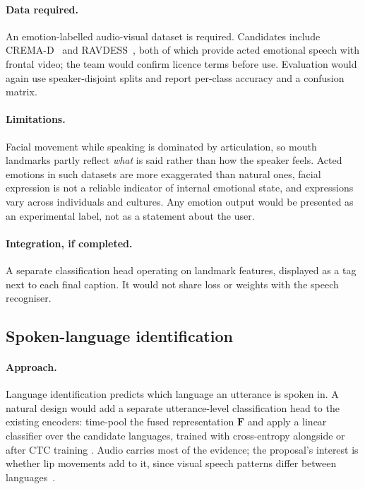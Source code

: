 \paragraph{Data required.} An emotion-labelled audio-visual dataset is
required. Candidates include CREMA-D~\cite{cao2014} and RAVDESS~\cite{livingstone2018},
both of which provide acted emotional speech with frontal video; the team would
confirm licence terms before use. Evaluation would again use speaker-disjoint
splits and report per-class accuracy and a confusion matrix.

\paragraph{Limitations.} Facial movement while speaking is dominated by
articulation, so mouth landmarks partly reflect \emph{what} is said rather than
how the speaker feels. Acted emotions in such datasets are more exaggerated than
natural ones, facial expression is not a reliable indicator of internal emotional
state, and expressions vary across individuals and cultures. Any emotion output
would be presented as an experimental label, not as a statement about the user.

\paragraph{Integration, if completed.} A separate classification head operating
on landmark features, displayed as a tag next to each final caption. It would not
share loss or weights with the speech recogniser.

\subsection{Spoken-language identification}
\paragraph{Approach.} Language identification predicts which language an
utterance is spoken in. A natural design would add a separate utterance-level
classification head to the existing encoders: time-pool the fused representation
$\mathbf{F}$ and apply a linear classifier over the candidate languages, trained
with cross-entropy alongside or after CTC training \tbd. Audio carries most of the
evidence; the proposal's interest is whether lip movements add to it, since visual
speech patterns differ between languages~\cite{aripin2024,kanavnet2026}.

